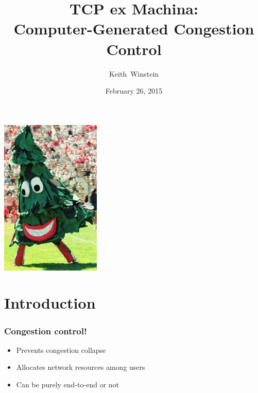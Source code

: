 \documentclass[svgnames]{beamer}
\title{TCP ex Machina: \\Computer-Generated Congestion Control}
\author{Keith~Winstein}
\institute{Stanford University}
\date{February 26, 2015}
\begin{document}
\begin{frame}[plain]

\titlepage

\noindent

\begin{centering}

\includegraphics[width=1.75 cm]{stanford-tree.jpg}

\end{centering}

\end{frame}

\section{Introduction}

\begin{frame}
\frametitle{Congestion control!}

\begin{itemize}

\Large

\item Prevents congestion collapse

\item Allocates network resources among users

\item Can be purely end-to-end or not

\end{itemize}

\end{frame}
\end{document}
